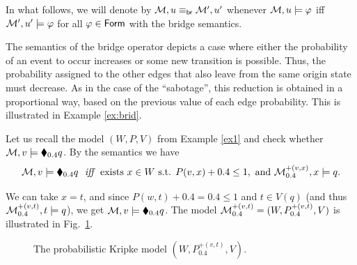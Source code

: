 In what follows, we will denote  by $\mathcal{M} , u \equiv_{\mathsf{br}} \mathcal{M}' , u'$ whenever $\mathcal{M} , u \models \varphi$ iff $\mathcal{M}' , u' \models \varphi$ for all $\varphi \in \mathsf{Form} $ with the bridge semantics.

\medskip

The semantics of the bridge operator depicts a case where either the probability of an event to occur increases or some new transition is possible. Thus, the probability assigned to the other edges that also leave from the same origin state must decrease. As in the case of the ``sabotage'', this reduction is obtained in a proportional way, based on the previous value of each edge probability. This is illustrated in Example \ref{ex:brid}.

\begin{example}\label{ex:brid}
Let us recall the model $(W,P,V)$ from Example \ref{ex1} and check whether $\mathcal{M},v\models\blacklozenge_{0.4} q$. By the semantics we have 
\[
\model,v\models\blacklozenge_{0.4} q \ \ \iff \ \ \text{exists } x\in W \text{ s.t. }P(v,x)+0.4 \leq 1,  \text{ and } \model^{+(v,x)}_{0.4}, x \models q.
\]

We can take $x=t$, and since $P(w,t)+0.4 = 0.4\leq 1$ and $t\in V(q)$ (and thus $\mathcal{M}^{+(v,t)}_{0.4}, t \models q$), we get $\mathcal{M},v\models\blacklozenge_{0.4} q$.
The model $\mathcal{M}^{+(v,t)}_{0.4}=(W,P^{+(v,t)}_{0.4},V)$ is illustrated in Fig.~\ref{fig:bridge}.

\begin{figure}[!ht]
    \centering
    \caption{The probabilistic Kripke model $(W,P^{+(v,t)}_{0.4},V)$.}
    \label{fig:bridge}
\end{figure}
\end{example}

